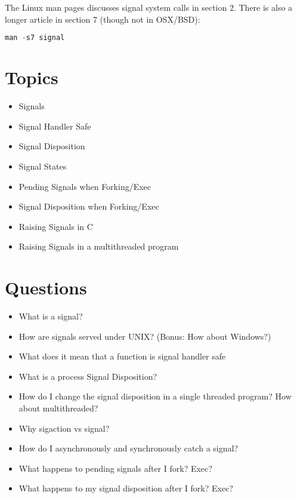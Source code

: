 The Linux man pages discusses signal system calls in section 2. There is also a longer article in section 7 (though not in OSX/BSD):

\begin{lstlisting}[language=C]
man -s7 signal
\end{lstlisting}

\section{Topics}

\begin{itemize}
\tightlist
\item
  Signals
\item
  Signal Handler Safe
\item
  Signal Disposition
\item
  Signal States
\item
  Pending Signals when Forking/Exec
\item
  Signal Disposition when Forking/Exec
\item
  Raising Signals in C
\item
  Raising Signals in a multithreaded program
\end{itemize}

\section{Questions}

\begin{itemize}
\tightlist
\item
  What is a signal?
\item
  How are signals served under UNIX? (Bonus: How about Windows?)
\item
  What does it mean that a function is signal handler safe
\item
  What is a process Signal Disposition?
\item
  How do I change the signal disposition in a single threaded program?
  How about multithreaded?
\item
  Why sigaction vs signal?
\item
  How do I asynchronously and synchronously catch a signal?
\item
  What happens to pending signals after I fork? Exec?
\item
  What happens to my signal disposition after I fork? Exec?
\end{itemize}



